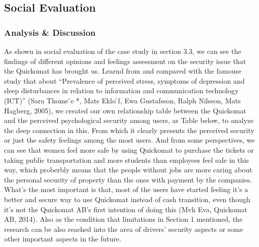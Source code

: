 \documentclass[twocolumn]{article}
\begin{document}
\subsection{Social Evaluation}

\subsubsection{Analysis \& Discussion}
As shown in social evaluation of the case study in section 3.3, we can see the findings of different opinions and feelings assessment on the security issue that the Quickomat has brought us. Learnd from and compared with the famouse study that about “Prevalence of perceived stress, symptoms of depression and sleep disturbances in relation to information and communication technology (ICT)” (Sara Thome ́e *, Mats Eklo ̈f, Ewa Gustafsson, Ralph Nilsson, Mats Hagberg, 2005), we created our own relationship table between the Quickomat and the perceived psychological security among users, as Table below, to analyze the deep connection in this.
From which it clearly presents the perceived security or just the safety feelings among the most users. And from some perspectives, we can see that women feel more safe by using Quickomat to purchase the tickets or taking public transportation and more students than employees feel safe in this way, which proberbly means that the people without jobs are more caring about the personal security of property than the ones with payment by the companies. What's the most important is that, most of the users have started feeling it's a better and secure way to use Quickomat instead of cash transition, even though it's not the Quickomat AB's first intention of doing this (Mvh Eva, Quickomat AB, 2014).
Also as the condition that limitations in Section 1 mentioned, the research can be also reached into the area of drivers' security aspects or some other important aspects in the future.
\end{document}
